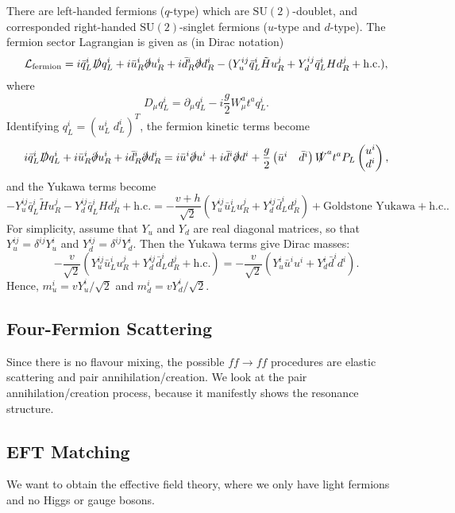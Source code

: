 \documentclass[11pt]{article}
\theoremstyle{definition}
\theoremstyle{remark}
\begin{document}
	There are left-handed fermions ($q$-type) which are $\mathrm{SU}(2)$-doublet, and corresponded right-handed $\mathrm{SU}(2)$-singlet fermions ($u$-type and $d$-type).
	The fermion sector Lagrangian is given as (in Dirac notation)
	\[\mathcal{L}_{\text{fermion}}=i\bar{q}_{L}^{i}\slashed{D}q_{L}^{i}+i\bar{u}_{R}^{i}\slashed{\partial}u_{R}^{i}+i\bar{d}_{R}^{i}\slashed{\partial}d_{R}^{i}-(Y_{u}^{ij}\bar{q}_{L}^{i}\tilde{H}u_{R}^{j}+Y_{d}^{ij}\bar{q}_{L}^{i}Hd_{R}^{j}+\mathrm{h.c.}),\]
	where
	\[D_{\mu}q_{L}^{i}=\partial_{\mu}q_{L}^{i}-i\frac{g}{2}W^{a}_{\mu}t^{a}q_{L}^{i}.\]
	Identifying $q^{i}_{L}=(u^{i}_{L}\;d^{i}_{L})^{T}$, the fermion kinetic terms become
	\[i\bar{q}_{L}^{i}\slashed{D}q_{L}^{i}+i\bar{u}_{R}^{i}\slashed{\partial}u_{R}^{i}+i\bar{d}_{R}^{i}\slashed{\partial}d_{R}^{i}=i\bar{u}^{i}\slashed{\partial}u^{i}+i\bar{d}^{i}\slashed{\partial}d^{i}+\frac{g}{2}\begin{pmatrix}\bar{u}^{i}&\bar{d}^{i}\end{pmatrix}\slashed{W}^{a}t^{a}P_{L}\begin{pmatrix}u^{i}\\d^{i}\end{pmatrix},\]
	and the Yukawa terms become
	\[-Y_{u}^{ij}\bar{q}_{L}^{i}\tilde{H}u_{R}^{j}-Y_{d}^{ij}\bar{q}_{L}^{i}Hd_{R}^{j}+\mathrm{h.c.}=-\frac{v+h}{\sqrt{2}}(Y_{u}^{ij}\bar{u}_{L}^{i}u_{R}^{j}+Y_{d}^{ij}\bar{d}_{L}^{i}d_{R}^{j})+\text{Goldstone Yukawa}+\mathrm{h.c.}.\]
	For simplicity, assume that $Y_{u}$ and $Y_{d}$ are real diagonal matrices, so that $Y_{u}^{ij}=\delta^{ij}Y_{u}^{i}$ and $Y_{d}^{ij}=\delta^{ij}Y_{d}^{i}$.
	Then the Yukawa terms give Dirac masses:
	\[-\frac{v}{\sqrt{2}}(Y_{u}^{ij}\bar{u}_{L}^{i}u_{R}^{j}+Y_{d}^{ij}\bar{d}_{L}^{i}d_{R}^{j}+\mathrm{h.c.})=-\frac{v}{\sqrt{2}}(Y_{u}^{i}\bar{u}^{i}u^{i}+Y_{d}^{i}\bar{d}^{i}d^{i}).\]
	Hence, $m_{u}^{i}=vY_{u}^{i}/\sqrt{2}$ and $m_{d}^{i}=vY_{d}^{i}/\sqrt{2}$.
	
	\subsection{Four-Fermion Scattering}
	Since there is no flavour mixing, the possible $ff\to ff$ procedures are elastic scattering and pair annihilation/creation.
	We look at the pair annihilation/creation process, because it manifestly shows the resonance structure.
	
	\subsection{EFT Matching}
	We want to obtain the effective field theory, where we only have light fermions and no Higgs or gauge bosons.
\end{document}

